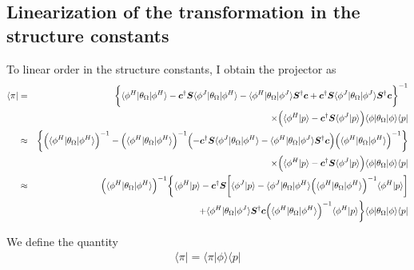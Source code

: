 \documentclass[11pt,a4paper]{report}
\begin{document}
\subsection{Linearization of the transformation 
in the structure constants}
To linear order in the structure constants, I obtain the projector as
\begin{eqnarray}
\langle\pi|
&=& 
\biggl\lbrace
\langle\phi^H|\theta_\Omega|\phi^H\rangle
-\mat{c}^\dagger\mat{S}\langle\phi^J|\theta_\Omega|\phi^H\rangle
-\langle\phi^H|\theta_\Omega|\phi^J\rangle\mat{S}^\dagger\mat{c}
+\mat{c}^\dagger\mat{S}\langle\phi^J|\theta_\Omega
|\phi^J\rangle\mat{S}^\dagger\mat{c}
\biggr\rbrace^{-1}
\nonumber\\
%
&&\times\Bigl(\langle\phi^H|p\rangle
-\mat{c}^\dagger\mat{S}\langle\phi^J|p\rangle\Bigr)
\langle\phi|\theta_\Omega|\phi\rangle
\langle{p}|
\nonumber\\
%
%
%
&\approx& 
\biggl\lbrace
\Bigl(\langle\phi^H|\theta_\Omega|\phi^H\rangle\Bigr)^{-1}
-
\Bigl(\langle\phi^H|\theta_\Omega|\phi^H\rangle\Bigr)^{-1}
\Bigl(
-\mat{c}^\dagger\mat{S}\langle\phi^J|\theta_\Omega|\phi^H\rangle
-\langle\phi^H|\theta_\Omega|\phi^J\rangle\mat{S}^\dagger\mat{c}
\Bigr)
\Bigl(\langle\phi^H|\theta_\Omega|\phi^H\rangle\Bigr)^{-1}
\biggr\rbrace
\nonumber\\
%
&&\times
\Bigl(
\langle\phi^H|p\rangle-\mat{c}^\dagger\mat{S}\langle\phi^J|p\rangle
\Bigr)
\langle\phi|\theta_\Omega|\phi\rangle
\langle{p}|
\nonumber\\
%
%
%
&\approx& 
\Bigl(\langle\phi^H|\theta_\Omega|\phi^H\rangle\Bigr)^{-1}
\biggl\lbrace
\langle\phi^H|p\rangle
-
\mat{c}^\dagger\mat{S}
\biggl[
\langle\phi^J|p\rangle
-
\langle\phi^J|\theta_\Omega|\phi^H\rangle
\Bigl(\langle\phi^H|\theta_\Omega|\phi^H\rangle\Bigr)^{-1}
\langle\phi^H|p\rangle\biggr]
\nonumber\\
&&+\langle\phi^H|\theta_\Omega|\phi^J\rangle\mat{S}^\dagger\mat{c}
\Bigl(\langle\phi^H|\theta_\Omega|\phi^H\rangle\Bigr)^{-1}
\langle\phi^H|p\rangle
\biggr\rbrace
\langle\phi|\theta_\Omega|\phi\rangle
\langle{p}|
\end{eqnarray}


We define the quantity
\begin{eqnarray}
\langle\pi|=\langle\pi|\phi\rangle\langle{p}|
\end{eqnarray}
\end{document}
